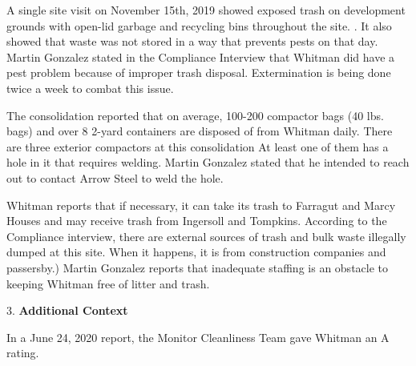 A single site visit on November 15th, 2019 showed exposed trash on development grounds with open-lid garbage and recycling bins throughout the site. . It also showed that waste was not stored in a way that prevents pests on that day. Martin Gonzalez stated in the Compliance Interview that Whitman did have a pest problem because of improper trash disposal. Extermination is being done twice a week to combat this issue.

The consolidation reported that on average, 100-200 compactor bags (40 lbs. bags) and over 8 2-yard containers are disposed of from Whitman daily. There are three exterior compactors at this consolidation At least one of them has a hole in it that requires welding. Martin Gonzalez stated that he intended to reach out to contact Arrow Steel to weld the hole.

Whitman reports that if necessary, it can take its trash to Farragut and Marcy Houses and may receive trash from Ingersoll and Tompkins. According to the Compliance interview, there are external sources of trash and bulk waste illegally dumped at this site. When it happens, it is from construction companies and passersby.) Martin Gonzalez reports that inadequate staffing is an obstacle to keeping Whitman free of litter and trash. 

3. \textbf{Additional Context} 

In a June 24, 2020 report, the Monitor Cleanliness Team gave Whitman an A rating. 